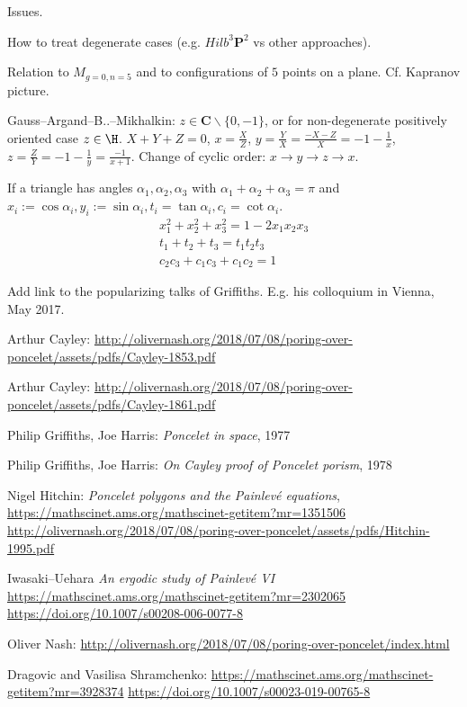 \documentclass[12pt]{article}
\numberwithin{equation}{section}
\renewcommand\C{\mathbf{C}}                  %
\renewcommand\P{\mathbf{P}}                  %
\begin{document}
Issues.

How to treat degenerate cases (e.g. $Hilb^3 \P^2$ vs other approaches).

Relation to $M_{g=0,n=5}$ and to configurations of $5$ points on a plane.
Cf. Kapranov picture.

Gauss--Argand--B..--Mikhalkin: $z\in\C\backslash\{0,-1\}$,
or for non-degenerate positively oriented case $z\in\H$.
$X+Y+Z=0$, $x=\frac{X}{Z}$, $y=\frac{Y}{X} = \frac{-X-Z}{X}=-1-\frac{1}{x}$,
$z=\frac{Z}{Y} = -1-\frac{1}{y} = \frac{-1}{x+1}$.
Change of cyclic order: $x\to y\to z\to x$.

If a triangle has angles $α_1,α_2,α_3$ with $α_1+α_2+α_3=π$
and $x_i := \cos α_i, y_i := \sin α_i, t_i = \tan α_i, c_i = \cot α_i $.
\begin{gather}
x_1^2 + x_2^2 + x_3 ^2 = 1 - 2 x_1 x_2 x_3 \\
t_1 + t_2 + t_3 = t_1 t_2 t_3 \\
c_2 c_3 + c_1 c_3 + c_1 c_2 = 1
\end{gather}



\printbibliography

\begin{thebibliography}{xxx}
Add link to the popularizing talks of Griffiths.
E.g. his colloquium in Vienna, May 2017.

Arthur Cayley:
\url{http://olivernash.org/2018/07/08/poring-over-poncelet/assets/pdfs/Cayley-1853.pdf}

Arthur Cayley:
\url{http://olivernash.org/2018/07/08/poring-over-poncelet/assets/pdfs/Cayley-1861.pdf}

Philip Griffiths, Joe Harris:
\emph{Poncelet in space}, 
1977 

Philip Griffiths, Joe Harris:
\emph{On Cayley proof of Poncelet porism},
1978 

Nigel Hitchin:
\emph{Poncelet polygons and the Painlevé equations},
\url{https://mathscinet.ams.org/mathscinet-getitem?mr=1351506} 
\url{http://olivernash.org/2018/07/08/poring-over-poncelet/assets/pdfs/Hitchin-1995.pdf}

Iwasaki--Uehara
\emph{An ergodic study of Painlevé VI} 
\url{https://mathscinet.ams.org/mathscinet-getitem?mr=2302065} 
\url{https://doi.org/10.1007/s00208-006-0077-8}

Oliver Nash:
\url{http://olivernash.org/2018/07/08/poring-over-poncelet/index.html}

Dragovic and Vasilisa Shramchenko:
\url{https://mathscinet.ams.org/mathscinet-getitem?mr=3928374}
\url{https://doi.org/10.1007/s00023-019-00765-8}

\end{thebibliography}
\end{document}
